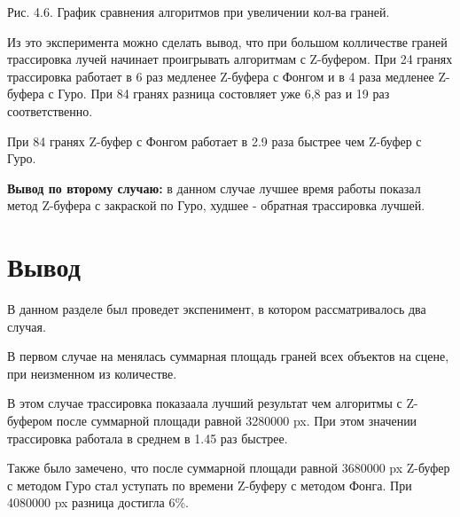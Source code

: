 \documentclass[12pt]{report}
\begin{document}
	\begin{center}
		\begin{center}
		\end{center}
		Рис. 4.6. График сравнения алгоритмов при увеличении кол-ва граней.
	\end{center}

	Из это эксперимента можно сделать вывод, что при большом колличестве граней трассировка лучей начинает проигрывать алгоритмам с Z-буфером. При 24 гранях трассировка работает в 6 раз медленее Z-буфера с Фонгом и в 4 раза медленее Z-буфера с Гуро. При 84 гранях разница состовляет уже 6,8 раз и 19 раз соответственно.
	
	При 84 гранях Z-буфер с Фонгом работает в 2.9 раза быстрее чем Z-буфер с Гуро.
	
	\textbf{Вывод по второму случаю:} в данном случае лучшее время работы показал метод Z-буфера с закраской по Гуро, худшее - обратная трассировка лучшей.
	
	\section*{Вывод}
	
	В данном разделе был проведет экспенимент, в котором рассматривалось два случая.
	
	В первом случае на менялась суммарная площадь граней всех объектов на сцене, при неизменном из количестве.
	
	В этом случае трассировка показаала лучший результат чем алгоритмы с Z-буфером после суммарной площади равной 3280000 px. При этом значении трассировка работала в среднем в 1.45 раз быстрее.
	
	Также было замечено, что после суммарной площади равной 3680000 px Z-буфер с методом Гуро стал уступать по времени Z-буферу с методом Фонга. При 4080000 px разница достигла 6\%.
	
\end{document}
